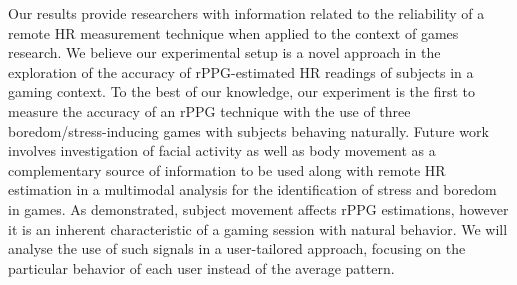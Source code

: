 Our results provide researchers with information related to the reliability of a remote HR measurement technique when applied to the context of games research. We believe our experimental setup is a novel approach in the exploration of the accuracy of rPPG-estimated HR readings of subjects in a gaming context. To the best of our knowledge, our experiment is the first to measure the accuracy of an rPPG technique with the use of three boredom/stress-inducing games with subjects behaving naturally. Future work involves investigation of facial activity as well as body movement as a complementary source of information to be used along with remote HR estimation in a multimodal analysis for the identification of stress and boredom in games. As demonstrated, subject movement affects rPPG estimations, however it is an inherent characteristic of a gaming session with natural behavior. We will analyse the use of such signals in a user-tailored approach, focusing on the particular behavior of each user instead of the average pattern.
